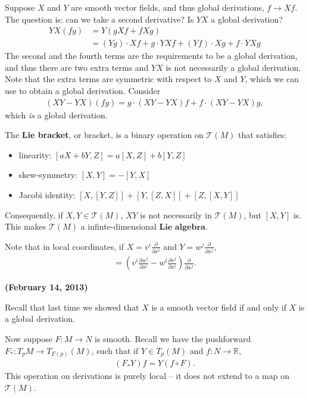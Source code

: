 \documentclass{../mathnotes}
\begin{document}
Suppose $X$ and $Y$ are smooth vector fields, and thus global derivations, $f\to Xf$. The question is: can we take a second derivative?
Is $YX$ a global derivation? 
\begin{align*}
    YX(fg)&=Y(gXf+fXg)\\
    &=(Yg)\cdot Xf+g\cdot YXf+(Yf)\cdot Xg+f\cdot YXg
\end{align*}
The second and the fourth terms are the requirements to be a global derivation, and thus there are two extra terms and $YX$ is not necessarily
a global derivation. Note that the extra terms are symmetric with respect to $X$ and $Y$, which we can use to obtain a global derivation. Consider
\begin{align*}
    (XY-YX)(fg)=g\cdot(XY-YX)f+f\cdot (XY-YX)g,
\end{align*}
which \textit{is} a global derivation.
\begin{defn}
    The \textbf{Lie bracket}, or bracket, is a binary operation on $\mathcal{T}(M)$ that satisfies:
    \begin{itemize}
        \item linearity: $[aX+bY,Z]=a[X,Z]+b[Y,Z]$
        \item skew-symmetry: $[X,Y]=-[Y,X]$
        \item Jacobi identity: $[X,[Y,Z]]+[Y,[Z,X]]+[Z,[X,Y]]$
    \end{itemize}
\end{defn}

Consequently, if $X,Y\in\mathcal{T}(M)$, $XY$ is not necessarily in $\mathcal{T}(M)$, but $[X,Y]$ is. This makes $\mathcal{T}(M)$ a infinte-dimensional
$\textbf{Lie algebra}$.

Note that in local coordinates, if $X=v^i\frac{\partial}{\partial x^i}$ and $Y=w^j\frac{\partial}{\partial x^j}$,
\begin{align*}
    [X,Y]=\left( v^i\frac{\partial w^j}{\partial x^i}-w^i\frac{\partial v^j}{\partial x^i}\right)\frac{\partial}{\partial x^j}.
\end{align*}

\newpage

\textbf{(February 14, 2013)}

Recall that last time we showed that $X$ is a smooth vector field if and only if $X$ is a global derivation.

Now suppose $F:M\to N$ is smooth. Recall we have the pushforward $F_*:T_pM\to T_{F(p)}(M)$, such that if $Y\in T_p(M)$ and $f:N\to\mathbb{R}$,
\begin{align*}
    (F_*Y)f=Y(f\circ F).
\end{align*}
This operation on derivations is purely local -- it does not extend to a map on $\mathcal{T}(M)$.
\end{document}
